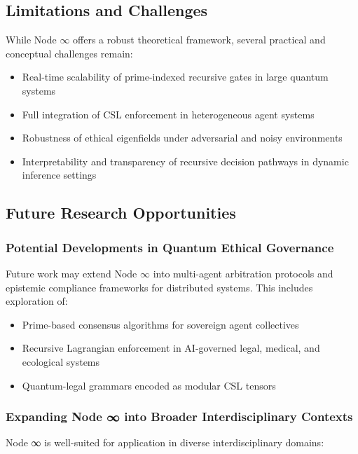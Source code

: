 \documentclass[12pt]{article}
\begin{document}
\subsection{Limitations and Challenges}

While Node \( \infty \) offers a robust theoretical framework, several practical and conceptual challenges remain:

\begin{itemize}
  \item Real-time scalability of prime-indexed recursive gates in large quantum systems
  \item Full integration of CSL enforcement in heterogeneous agent systems
  \item Robustness of ethical eigenfields under adversarial and noisy environments
  \item Interpretability and transparency of recursive decision pathways in dynamic inference settings
\end{itemize}

\subsection{Future Research Opportunities}

\subsubsection*{Potential Developments in Quantum Ethical Governance}

Future work may extend Node \( \infty \) into multi-agent arbitration protocols and epistemic compliance frameworks for distributed systems. This includes exploration of:

\begin{itemize}
  \item Prime-based consensus algorithms for sovereign agent collectives
  \item Recursive Lagrangian enforcement in AI-governed legal, medical, and ecological systems
  \item Quantum-legal grammars encoded as modular CSL tensors
\end{itemize}

\subsubsection*{Expanding Node ∞ into Broader Interdisciplinary Contexts}

Node ∞ is well-suited for application in diverse interdisciplinary domains:
\end{document}
